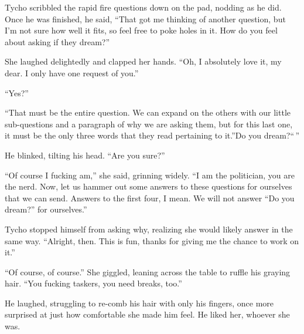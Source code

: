 Tycho scribbled the rapid fire questions down on the pad, nodding as he did. Once he was finished, he said, ``That got me thinking of another question, but I'm not sure how well it fits, so feel free to poke holes in it. How do you feel about asking if they dream?''

She laughed delightedly and clapped her hands. ``Oh, I absolutely love it, my dear. I only have one request of you.''

``Yes?''

``That must be the entire question. We can expand on the others with our little sub-questions and a paragraph of why we are asking them, but for this last one, it must be the only three words that they read pertaining to it.''Do you dream?{}``\,''

He blinked, tilting his head. ``Are you sure?''

``Of course I fucking am,'' she said, grinning widely. ``I am the politician, you are the nerd. Now, let us hammer out some answers to these questions for ourselves that we can send. Answers to the first four, I mean. We will not answer ``Do you dream?'' for ourselves.''

Tycho stopped himself from asking why, realizing she would likely answer in the same way. ``Alright, then. This is fun, thanks for giving me the chance to work on it.''

``Of course, of course.'' She giggled, leaning across the table to ruffle his graying hair. ``You fucking taskers, you need breaks, too.''

He laughed, struggling to re-comb his hair with only his fingers, once more surprised at just how comfortable she made him feel. He liked her, whoever she was.
